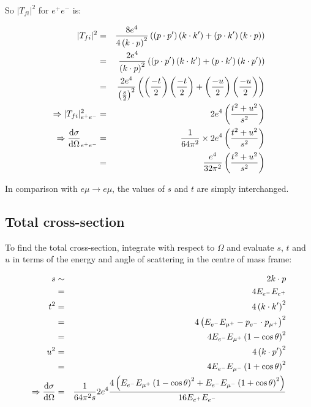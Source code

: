 So $|T_{fi}|^2$ for $e^+e^-$ is:

\begin{eqnarray*}
  |T_{fi}|^2 & = & \frac{8e^4}{4\left(k\cdot p\right)^2}\left(\left(p\cdot p'\right)\left(k\cdot k'\right) + \left(p\cdot k'\right)\left(k\cdot p\right)\right) \\
  & = & \frac{2e^4}{\left(k\cdot p\right)^2}\left(\left(p\cdot p'\right)\left(k\cdot k'\right) + \left(p\cdot k'\right)\left(k\cdot p'\right)\right) \\
  & = & \frac{2e^4}{\left(\frac{s}{2}\right)^2}\left(\left(\frac{-t}{2}\right)\left(\frac{-t}{2}\right) + \left(\frac{-u}{2}\right)\left(\frac{-u}{2}\right)\right) \\
  \Rightarrow |T_{fi}|^2_{e^+e^-} & = & 2e^4\left(\frac{t^2 + u^2}{s^2}\right) \\
  \Rightarrow \frac{\mathrm{d}\sigma}{\mathrm{d}\Omega}_{e^+e^-} & = & \frac{1}{64\pi^2}\times2e^4\left(\frac{t^2 + u^2}{s^2}\right) \\
  & = & \frac{e^4}{32\pi^2}\left(\frac{t^2 + u^2}{s^2}\right)
\end{eqnarray*}

In comparison with $e\mu \to e\mu$, the values of $s$ and $t$ are simply interchanged.

\subsection{Total cross-section}

To find the total cross-section, integrate with respect to $\Omega$ and evaluate $s$, $t$ and $u$ in terms of the energy and angle of scattering in the centre of mass frame:

\begin{eqnarray*}
  s   & \sim & 2k\cdot p \\
      & =    & 4E_{e^-}E_{e^+} \\
  t^2 & =    & 4\left(k\cdot k'\right)^2 \\
      & =    & 4\left(E_{e^-}E_{\mu^+} - p_{e^-}\cdot p_{\mu^+} \right)^2 \\
      & =    & 4E_{e^-}E_{\mu^+}\left(1 - \cos\theta\right)^2 \\
  u^2 & =    & 4\left(k\cdot p'\right)^2 \\
      & =    & 4E_{e^-}E_{\mu^-}\left(1 + \cos\theta\right)^2 \\
  \Rightarrow \frac{\mathrm{d}\sigma}{\mathrm{d}\Omega} & = & \frac{1}{64\pi^2s}2e^4\frac{4\left(E_{e^-}E_{\mu^+}\left(1 - \cos\theta\right)^2 + E_{e^-}E_{\mu^-}\left(1 + \cos\theta\right)^2\right)}{16 E_{e^+}E_{e^-}}
\end{eqnarray*}


